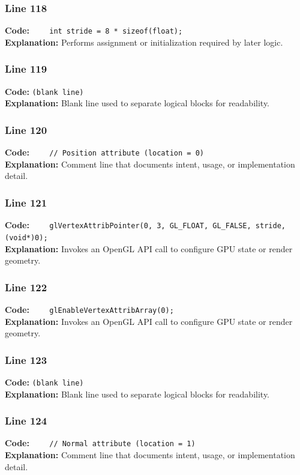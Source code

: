 \documentclass[11pt,a4paper]{article}
\begin{document}
\subsubsection*{Line 118}
\textbf{Code:} \verb|    int stride = 8 * sizeof(float);|\\
\textbf{Explanation:} Performs assignment or initialization required by later logic.

\subsubsection*{Line 119}
\textbf{Code:} \texttt{(blank line)}\\
\textbf{Explanation:} Blank line used to separate logical blocks for readability.

\subsubsection*{Line 120}
\textbf{Code:} \verb|    // Position attribute (location = 0)|\\
\textbf{Explanation:} Comment line that documents intent, usage, or implementation detail.

\subsubsection*{Line 121}
\textbf{Code:} \verb|    glVertexAttribPointer(0, 3, GL_FLOAT, GL_FALSE, stride, (void*)0);|\\
\textbf{Explanation:} Invokes an OpenGL API call to configure GPU state or render geometry.

\subsubsection*{Line 122}
\textbf{Code:} \verb|    glEnableVertexAttribArray(0);|\\
\textbf{Explanation:} Invokes an OpenGL API call to configure GPU state or render geometry.

\subsubsection*{Line 123}
\textbf{Code:} \texttt{(blank line)}\\
\textbf{Explanation:} Blank line used to separate logical blocks for readability.

\subsubsection*{Line 124}
\textbf{Code:} \verb|    // Normal attribute (location = 1)|\\
\textbf{Explanation:} Comment line that documents intent, usage, or implementation detail.
\end{document}
